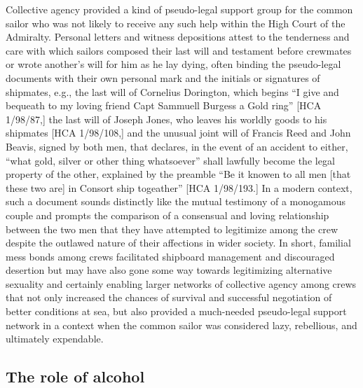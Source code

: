 Collective agency provided a kind of pseudo-legal support group for the common sailor who was not likely to receive any such help within the High Court of the Admiralty. Personal letters and witness depositions attest to the tenderness and care with which sailors composed their last will and testament before crewmates or wrote another’s will for him as he lay dying, often binding the pseudo-legal documents with their own personal mark and the initials or signatures of shipmates, e.g., the last will of Cornelius Dorington, which begins “I give and bequeath to my loving friend Capt Sammuell Burgess a Gold ring” [HCA 1/98/87,] the last will of Joseph Jones, who leaves his worldly goods to his shipmates [HCA 1/98/108,] and the unusual joint will of Francis Reed and John Beavis, signed by both men, that declares, in the event of an accident to either, “what gold, silver or other thing whatsoever” shall lawfully become the legal property of the other, explained by the preamble “Be it knowen to all men [that these two are] in Consort ship togeather” [HCA 1/98/193.] In a modern context, such a document sounds distinctly like the mutual testimony of a monogamous couple and prompts the comparison of a consensual and loving relationship between the two men that they have attempted to legitimize among the crew despite the outlawed nature of their affections in wider society. In short, familial mess bonds among crews facilitated shipboard management and discouraged desertion but may have also gone some way towards legitimizing alternative sexuality and certainly enabling larger networks of collective agency among crews that not only increased the chances of survival and successful negotiation of better conditions at sea, but also provided a much-needed pseudo-legal support network in a context when the common sailor was considered lazy, rebellious, and ultimately expendable. 

\subsection{{The} {role} {of} {alcohol} }%

